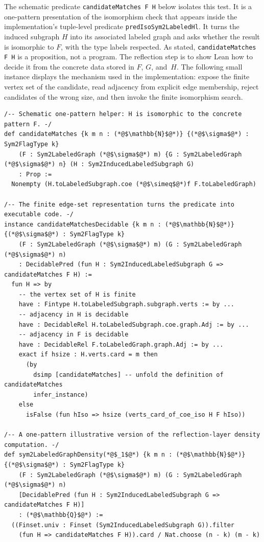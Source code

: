 \documentclass{article}
\newcommand{\lean}[1]{\texttt{#1}}
\begin{document}
The schematic predicate \lean{candidateMatches F H} below isolates this test.
It is a one-pattern presentation of the isomorphism check that appears inside
the implementation's tuple-level predicate \lean{predIsoSym2LabeledHl}.  It
turns the induced subgraph \(H\) into its associated labeled graph and asks
whether the result is isomorphic to \(F\), with the type labels respected.  As
stated, \lean{candidateMatches F H} is a proposition, not a program.  The
reflection step is to show Lean how to decide it from the concrete
data stored in \(F\), \(G\), and~\(H\).  The following small instance displays
the mechanism used in the implementation: expose the finite vertex set of the
candidate, read adjacency from explicit edge membership, reject candidates of
the wrong size, and then invoke the finite isomorphism search.
\begin{lstlisting}
/-- Schematic one-pattern helper: H is isomorphic to the concrete pattern F. -/
def candidateMatches {k m n : (*@$\mathbb{N}$@*)} {(*@$\sigma$@*) : Sym2FlagType k}
    (F : Sym2LabeledGraph (*@$\sigma$@*) m) {G : Sym2LabeledGraph (*@$\sigma$@*) n} (H : Sym2InducedLabeledSubgraph G)
    : Prop :=
  Nonempty (H.toLabeledSubgraph.coe (*@$\simeq$@*)f F.toLabeledGraph)

/-- The finite edge-set representation turns the predicate into executable code. -/
instance candidateMatchesDecidable {k m n : (*@$\mathbb{N}$@*)} {(*@$\sigma$@*) : Sym2FlagType k}
    (F : Sym2LabeledGraph (*@$\sigma$@*) m) (G : Sym2LabeledGraph (*@$\sigma$@*) n)
    : DecidablePred (fun H : Sym2InducedLabeledSubgraph G => candidateMatches F H) :=
  fun H => by
    -- the vertex set of H is finite
    have : Fintype H.toLabeledSubgraph.subgraph.verts := by ...
    -- adjacency in H is decidable
    have : DecidableRel H.toLabeledSubgraph.coe.graph.Adj := by ...
    -- adjacency in F is decidable
    have : DecidableRel F.toLabeledGraph.graph.Adj := by ...
    exact if hsize : H.verts.card = m then
      (by
        dsimp [candidateMatches] -- unfold the definition of candidateMatches
        infer_instance)
    else
      isFalse (fun hIso => hsize (verts_card_of_coe_iso H F hIso))

/-- A one-pattern illustrative version of the reflection-layer density computation. -/
def sym2LabeledGraphDensity(*@$_1$@*) {k m n : (*@$\mathbb{N}$@*)} {(*@$\sigma$@*) : Sym2FlagType k}
    (F : Sym2LabeledGraph (*@$\sigma$@*) m) (G : Sym2LabeledGraph (*@$\sigma$@*) n)
    [DecidablePred (fun H : Sym2InducedLabeledSubgraph G => candidateMatches F H)]
    : (*@$\mathbb{Q}$@*) :=
  ((Finset.univ : Finset (Sym2InducedLabeledSubgraph G)).filter
    (fun H => candidateMatches F H)).card / Nat.choose (n - k) (m - k)
\end{lstlisting}
\end{document}
